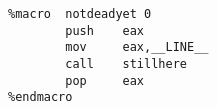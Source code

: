\begin{lstlisting}
%macro  notdeadyet 0
        push    eax
        mov     eax,__LINE__
        call    stillhere
        pop     eax
%endmacro
\end{lstlisting}

%
%
%
%
%
%
%
%
%
%
%
%
%
%
%
